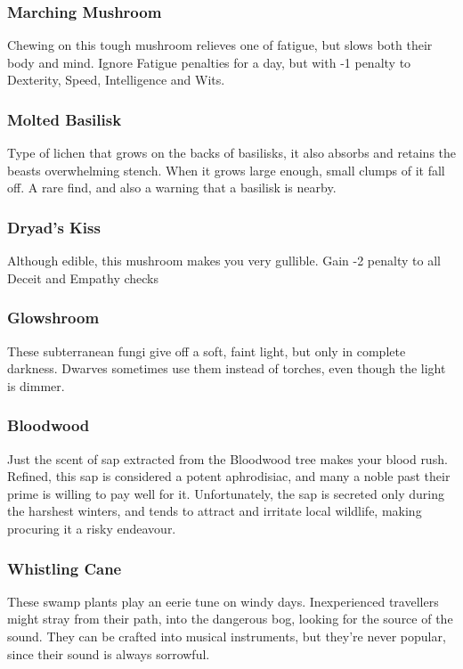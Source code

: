 \begin{multicols}{2}
\subsubsection{Marching Mushroom}
\label{marching_mushroom}

Chewing on this tough mushroom relieves one of fatigue, but slows both their body and mind. Ignore Fatigue penalties for a day, but 
with -1 penalty to Dexterity, Speed, Intelligence and Wits.

\subsubsection{Molted Basilisk}
\label{molted_basilisk}

Type of lichen that grows on the backs of basilisks, it also absorbs and retains the beasts overwhelming stench. When it grows large 
enough, small clumps of it fall off. A rare find, and also a warning that a basilisk is nearby.

\subsubsection{Dryad's Kiss}
\label{dryads_kiss}

Although edible, this mushroom makes you very gullible. Gain -2 penalty to all Deceit and Empathy checks

\subsubsection{Glowshroom}
\label{glowshroom}

These subterranean fungi give off a soft, faint light, but only in complete darkness. Dwarves sometimes use them instead of torches, 
even though the light is dimmer.

\subsubsection{Bloodwood}
\label{bloodwood}

Just the scent of sap extracted from the Bloodwood tree makes your blood rush. Refined, this sap is considered a potent aphrodisiac, 
and many a noble past their prime is willing to pay well for it. Unfortunately, the sap is secreted only during the harshest winters, 
and tends to attract and irritate local wildlife, making procuring it a risky endeavour.

\subsubsection{Whistling Cane}
\label{whistlingCane}

These swamp plants play an eerie tune on windy days. Inexperienced travellers might stray from their path, into the dangerous bog, 
looking for the source of the sound. They can be crafted into musical instruments, but they're never popular, since their sound is 
always sorrowful.

\end{multicols}
